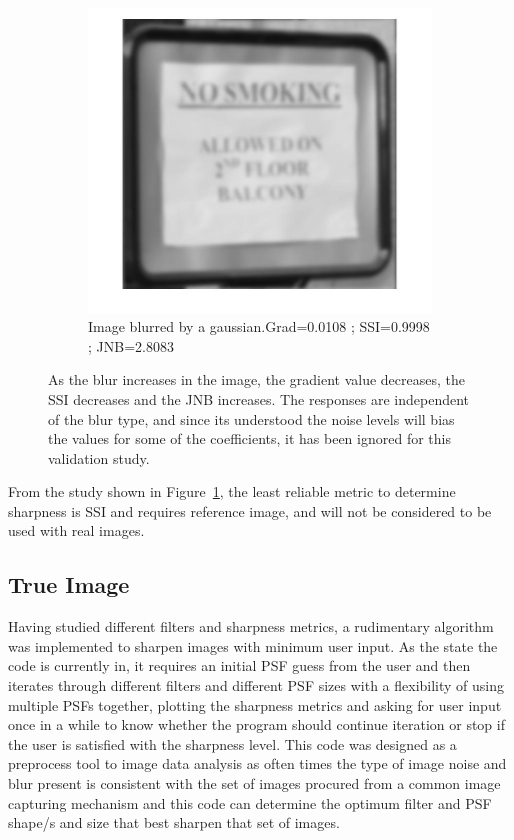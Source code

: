 \begin{figure}[h!]
\begin{subfigure}[b]{0.3\textwidth}
        \end{subfigure}
        \begin{subfigure}[b]{0.3\textwidth}
                \centering
                \includegraphics[width=\textwidth]{sign_G.jpg}
                \caption{Image blurred by a gaussian.\newline Grad=0.0108 ; SSI=0.9998 ; JNB=2.8083} 
        \end{subfigure} 
       
        \caption{As the blur increases in the image, the gradient value decreases, the SSI decreases and the JNB increases. The responses are independent of the blur type, and since its understood the noise levels will bias the values for some of the  coefficients, it has been ignored for this validation study.} \label{fig:train_metrics}
\end{figure}

\noindent From the study shown in Figure~\ref{fig:train_metrics}, the least reliable metric to determine sharpness is SSI and requires reference image, and will not be considered to be used with real images.

\subsection{True Image}
Having studied different filters and sharpness metrics, a rudimentary algorithm was implemented to sharpen images with minimum user input. As the state the code is currently in, it requires an initial PSF guess from the user and then iterates through different filters and different PSF sizes with a flexibility of using multiple PSFs together, plotting the sharpness metrics and asking for user input once in a while to know whether the program should continue iteration or stop if the user is satisfied with the sharpness level. This code was designed as a preprocess tool to image data analysis as often times the type of image noise and blur present is consistent with the set of images procured from a common image capturing mechanism and this code can determine the optimum filter and PSF shape/s and size that best sharpen that set of images. 

